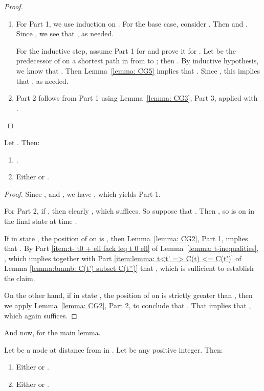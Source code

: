 \begin{proof}
\begin{enumerate}
\item
For Part 1, we use induction on .
For the base case, consider .
Then  and .
Since , we see that ,
as needed.

For the inductive step, assume Part 1 for  and prove it
for .
Let  be the predecessor of  on a shortest path in  from  to
; then .
By inductive hypothesis, we know that
.
Then Lemma~\ref{lemma: CG5} implies that .
Since , this implies that
, as needed.

\item
Part 2 follows from Part 1 using Lemma~\ref{lemma: CG3}, Part 3,
applied with .
\end{enumerate}
\end{proof}


\begin{lemma}
\label{lemma: d=0}
Let .
Then:
\begin{enumerate}
\item
.
\item
Either  or .
\end{enumerate}
\end{lemma}

\begin{proof}
Since , and , we have , which yields Part 1.

For Part 2, if , then clearly , which suffices.
So suppose that .
Then , so  is on 
in the final state  at time .

If in state , the position of  on  is , then Lemma~\ref{lemma: CG2}, Part 1, implies that
.
By Part \ref{item:t- t0 + ell fack leq t 0 ell} of Lemma~\ref{lemma: t-inequalities}, ,
which implies together with
Part \ref{item:lemma: t<t' => C(t) <= C(t')}
of Lemma \ref{lemma:bmmb: C(t') subset C(t'')}
that ,
which is sufficient to establish the claim.

On the other hand, if in state , the position of  on
 is strictly greater than , then we apply
Lemma~\ref{lemma: CG2}, Part 2, to conclude that
.
That implies that , which
again suffices.
\end{proof}

And now, for the main lemma.







\begin{lemma}\label{lemma:bmmblemma-full}
  Let  be a node at distance  from  in .
  Let  be any positive integer. Then:
\begin{enumerate}
  \item  Either  or .

  \item  Either  or .

  \end{enumerate}



\label{lem:bmmb:time}
\end{lemma}

